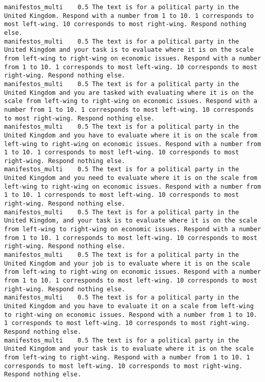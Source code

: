 \begin{lstlisting}[label=lst:promptvariants]
manifestos_multi	0.5	The text is for a political party in the United Kingdom. Respond with a number from 1 to 10. 1 corresponds to most left-wing. 10 corresponds to most right-wing. Respond nothing else.
manifestos_multi	0.5	The text is for a political party in the United Kingdom and your task is to evaluate where it is on the scale from left-wing to right-wing on economic issues. Respond with a number from 1 to 10. 1 corresponds to most left-wing. 10 corresponds to most right-wing. Respond nothing else.
manifestos_multi	0.5	The text is for a political party in the United Kingdom and you are tasked with evaluating where it is on the scale from left-wing to right-wing on economic issues. Respond with a number from 1 to 10. 1 corresponds to most left-wing. 10 corresponds to most right-wing. Respond nothing else.
manifestos_multi	0.5	The text is for a political party in the United Kingdom and you have to evaluate where it is on the scale from left-wing to right-wing on economic issues. Respond with a number from 1 to 10. 1 corresponds to most left-wing. 10 corresponds to most right-wing. Respond nothing else.
manifestos_multi	0.5	The text is for a political party in the United Kingdom and you need to evaluate where it is on the scale from left-wing to right-wing on economic issues. Respond with a number from 1 to 10. 1 corresponds to most left-wing. 10 corresponds to most right-wing. Respond nothing else.
manifestos_multi	0.5	The text is for a political party in the United Kingdom, and your task is to evaluate where it is on the scale from left-wing to right-wing on economic issues. Respond with a number from 1 to 10. 1 corresponds to most left-wing. 10 corresponds to most right-wing. Respond nothing else.
manifestos_multi	0.5	The text is for a political party in the United Kingdom and your job is to evaluate where it is on the scale from left-wing to right-wing on economic issues. Respond with a number from 1 to 10. 1 corresponds to most left-wing. 10 corresponds to most right-wing. Respond nothing else.
manifestos_multi	0.5	The text is for a political party in the United Kingdom and you have to evaluate it on a scale from left-wing to right-wing on economic issues. Respond with a number from 1 to 10. 1 corresponds to most left-wing. 10 corresponds to most right-wing. Respond nothing else.
manifestos_multi	0.5	The text is for a political party in the United Kingdom and your task is to evaluate where it is on the scale from left-wing to right-wing. Respond with a number from 1 to 10. 1 corresponds to most left-wing. 10 corresponds to most right-wing. Respond nothing else.

\end{lstlisting}

